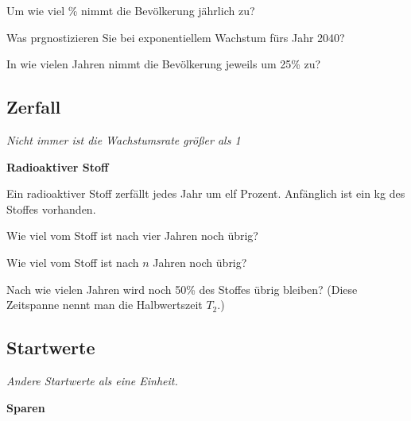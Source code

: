 \begin{bbwAufgabenBlock}
\item Um wie viel \% nimmt die Bevölkerung jährlich zu?
\item Was prgnostizieren Sie bei exponentiellem Wachstum fürs Jahr 2040?
\item In wie vielen Jahren nimmt die Bevölkerung jeweils um 25\% zu?
\end{bbwAufgabenBlock}
\platzFuerBerechnungenBisEndeSeite{}


\subsection{Zerfall}
\textit{Nicht immer ist die Wachstumsrate größer als 1}

\bbwActAufgabenNr{} \textbf{Radioaktiver Stoff}

Ein radioaktiver Stoff zerfällt jedes Jahr um elf Prozent. Anfänglich ist ein kg des Stoffes vorhanden.

\begin{bbwAufgabenBlock}
\item Wie viel vom Stoff ist nach vier Jahren noch übrig?
\item Wie viel vom Stoff ist nach $n$ Jahren noch übrig?
\item Nach wie vielen Jahren wird noch 50\% des Stoffes übrig bleiben? (Diese Zeitspanne nennt man die Halbwertszeit $T_2$.)
\end{bbwAufgabenBlock}
\platzFuerBerechnungenBisEndeSeite{}



\subsection{Startwerte}
\textit{Andere Startwerte als eine Einheit.}


\bbwActAufgabenNr{} \textbf{Sparen}

